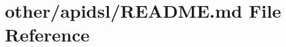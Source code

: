 \hypertarget{other_2apidsl_2_r_e_a_d_m_e_8md}{\section{other/apidsl/\+R\+E\+A\+D\+M\+E.md File Reference}
\label{other_2apidsl_2_r_e_a_d_m_e_8md}
}
